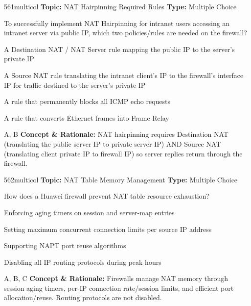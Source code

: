 \begin{qcard}{561}{multicol}
\textcolor{darkslate!75}{\small\textbf{Topic:} NAT Hairpinning Required Rules \hfill \textbf{Type:} Multiple Choice}\vspace{0.4em}\par
To successfully implement NAT Hairpinning for intranet users accessing an intranet server via public IP, which two policies/rules are needed on the firewall?
\begin{qoptions}
\item A Destination NAT / NAT Server rule mapping the public IP to the server's private IP
\item A Source NAT rule translating the intranet client's IP to the firewall's interface IP for traffic destined to the server's private IP
\item A rule that permanently blocks all ICMP echo requests
\item A rule that converts Ethernet frames into Frame Relay
\end{qoptions}
\end{qcard}
\nopagebreak
\begin{explainbox}{A, B}
\textbf{Concept \& Rationale:} NAT hairpinning requires Destination NAT (translating the public server IP to private server IP) AND Source NAT (translating client private IP to firewall IP) so server replies return through the firewall.
\end{explainbox}

\begin{qcard}{562}{multicol}
\textcolor{darkslate!75}{\small\textbf{Topic:} NAT Table Memory Management \hfill \textbf{Type:} Multiple Choice}\vspace{0.4em}\par
How does a Huawei firewall prevent NAT table resource exhaustion?
\begin{qoptions}
\item Enforcing aging timers on session and server-map entries
\item Setting maximum concurrent connection limits per source IP address
\item Supporting NAPT port reuse algorithms
\item Disabling all IP routing protocols during peak hours
\end{qoptions}
\end{qcard}
\nopagebreak
\begin{explainbox}{A, B, C}
\textbf{Concept \& Rationale:} Firewalls manage NAT memory through session aging timers, per-IP connection rate/session limits, and efficient port allocation/reuse. Routing protocols are not disabled.
\end{explainbox}

